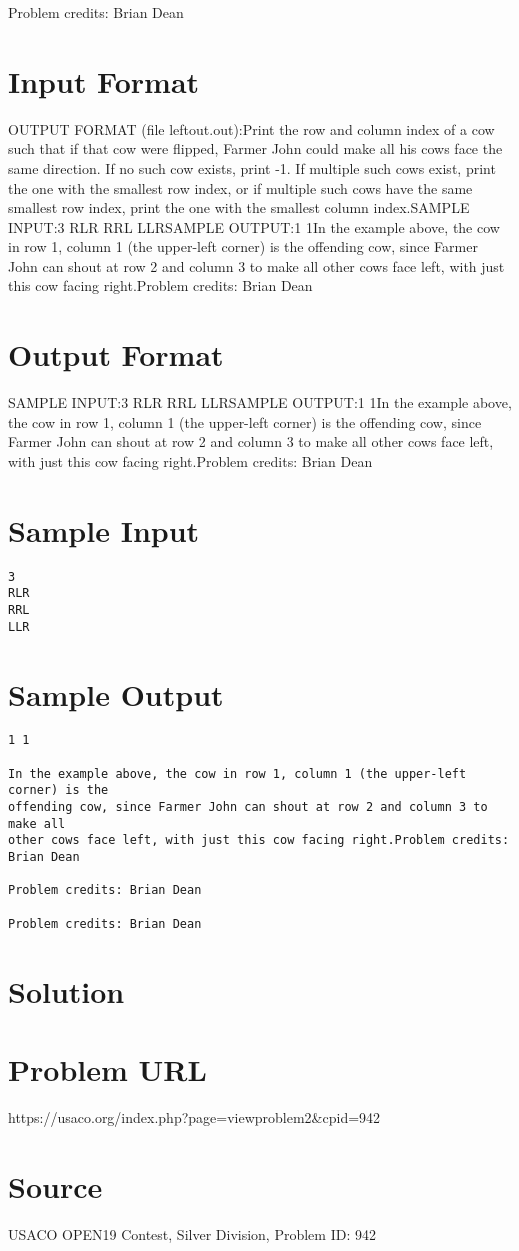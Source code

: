 \documentclass[12pt]{article}
\begin{document}
Problem credits: Brian Dean



\section*{Input Format}
OUTPUT FORMAT (file leftout.out):Print the row and column index of a cow such that if that cow were flipped,
Farmer John could make all his cows face the same direction.  If no such cow
exists, print -1.  If multiple such cows exist, print the one with the  smallest
row index, or if multiple such cows have the same smallest row index, print the
one with the smallest column index.SAMPLE INPUT:3
RLR
RRL
LLRSAMPLE OUTPUT:1 1In the example above, the cow in row 1, column 1 (the upper-left corner) is the
offending cow, since Farmer John can shout at row 2 and column 3 to make all
other cows face left, with just this cow facing right.Problem credits: Brian Dean

\section*{Output Format}
SAMPLE INPUT:3
RLR
RRL
LLRSAMPLE OUTPUT:1 1In the example above, the cow in row 1, column 1 (the upper-left corner) is the
offending cow, since Farmer John can shout at row 2 and column 3 to make all
other cows face left, with just this cow facing right.Problem credits: Brian Dean

\section*{Sample Input}
\begin{verbatim}
3
RLR
RRL
LLR
\end{verbatim}

\section*{Sample Output}
\begin{verbatim}
1 1

In the example above, the cow in row 1, column 1 (the upper-left corner) is the
offending cow, since Farmer John can shout at row 2 and column 3 to make all
other cows face left, with just this cow facing right.Problem credits: Brian Dean

Problem credits: Brian Dean

Problem credits: Brian Dean
\end{verbatim}

\section*{Solution}


\section*{Problem URL}
https://usaco.org/index.php?page=viewproblem2&cpid=942

\section*{Source}
USACO OPEN19 Contest, Silver Division, Problem ID: 942
\end{document}
